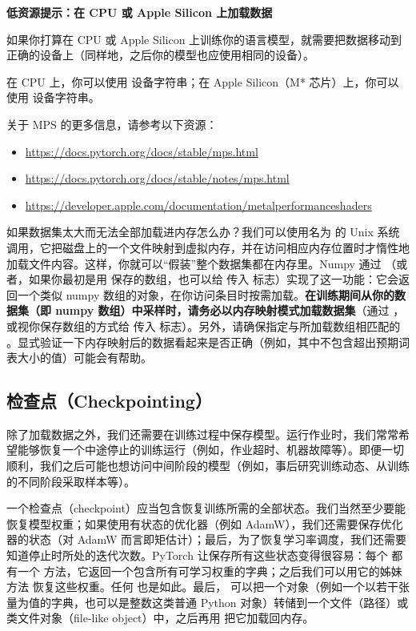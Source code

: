 \textbf{低资源提示：在 CPU 或 Apple Silicon 上加载数据}

如果你打算在 CPU 或 Apple Silicon 上训练你的语言模型，就需要把数据移动到正确的设备上（同样地，之后你的模型也应使用相同的设备）。

在 CPU 上，你可以使用  设备字符串；在 Apple Silicon（M* 芯片）上，你可以使用  设备字符串。

关于 MPS 的更多信息，请参考以下资源：
\begin{itemize}
  \item \url{https://docs.pytorch.org/docs/stable/mps.html}
  \item \url{https://docs.pytorch.org/docs/stable/notes/mps.html}
  \item \url{https://developer.apple.com/documentation/metalperformanceshaders}
\end{itemize}

如果数据集太大而无法全部加载进内存怎么办？我们可以使用名为  的 Unix 系统调用，它把磁盘上的一个文件映射到虚拟内存，并在访问相应内存位置时才惰性地加载文件内容。这样，你就可以``假装''整个数据集都在内存里。Numpy 通过 （或者，如果你最初是用  保存的数组，也可以给  传入  标志）实现了这一功能：它会返回一个类似 numpy 数组的对象，在你访问条目时按需加载。\textbf{在训练期间从你的数据集（即 numpy 数组）中采样时，请务必以内存映射模式加载数据集}（通过 ，或视你保存数组的方式给  传入  标志）。另外，请确保指定与所加载数组相匹配的 。显式验证一下内存映射后的数据看起来是否正确（例如，其中不包含超出预期词表大小的值）可能会有帮助。

\subsection{检查点（Checkpointing）}

除了加载数据之外，我们还需要在训练过程中保存模型。运行作业时，我们常常希望能够恢复一个中途停止的训练运行（例如，作业超时、机器故障等）。即便一切顺利，我们之后可能也想访问中间阶段的模型（例如，事后研究训练动态、从训练的不同阶段采取样本等）。

一个检查点（checkpoint）应当包含恢复训练所需的全部状态。我们当然至少要能恢复模型权重；如果使用有状态的优化器（例如 AdamW），我们还需要保存优化器的状态（对 AdamW 而言即矩估计）；最后，为了恢复学习率调度，我们还需要知道停止时所处的迭代次数。PyTorch 让保存所有这些状态变得很容易：每个  都有一个  方法，它返回一个包含所有可学习权重的字典；之后我们可以用它的姊妹方法  恢复这些权重。任何  也是如此。最后， 可以把一个对象（例如一个以若干张量为值的字典，也可以是整数这类普通 Python 对象）转储到一个文件（路径）或类文件对象（file-like object）中，之后再用  把它加载回内存。

